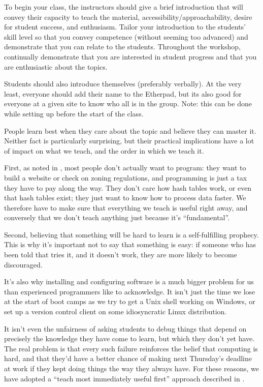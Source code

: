 

To begin your class, the instructors should give a brief introduction
that will convey their capacity to teach the material,
accessibility/approachability, desire for student success, and
enthusiasm. Tailor your introduction to the students' skill level so
that you convey competence (without seeming too advanced) and
demonstrate that you can relate to the students. Throughout the
workshop, continually demonstrate that you are interested in student
progress and that you are enthusiastic about the topics.

Students should also introduce themselves (preferably verbally). At the
very least, everyone should add their name to the Etherpad, but its also
good for everyone at a given site to know who all is in the group. Note:
this can be done while setting up before the start of the class.


People learn best when they care about the topic and believe they can
master it. Neither fact is particularly surprising, but their
practical implications have a lot of impact on what we teach, and the
order in which we teach it.

First, as noted in , most people don't
actually want to program: they want to build a website or check on
zoning regulations, and programming is just a tax they have to pay
along the way. They don't care how hash tables work, or even that hash
tables exist; they just want to know how to process data faster. We
therefore have to make sure that everything we teach is useful right
away, and conversely that we don't teach anything just because it's
``fundamental''.

Second, believing that something will be hard to learn is a
self-fulfilling prophecy. This is why it's important not to say that
something is easy: if someone who has been told that tries it, and it
doesn't work, they are more likely to become discouraged.

It's also why installing and configuring software is a much bigger
problem for us than experienced programmers like to acknowledge. It
isn't just the time we lose at the start of boot camps as we try to
get a Unix shell working on Windows, or set up a version control
client on some idiosyncratic Linux distribution.

It isn't even the unfairness of asking students to debug things that
depend on precisely the knowledge they have come to learn, but which
they don't yet have. The real problem is that every such failure
reinforces the belief that computing is hard, and that they'd have a
better chance of making next Thursday's deadline at work if they kept
doing things the way they always have. For these reasons, we have
adopted a ``teach most immediately useful first'' approach described
in .

